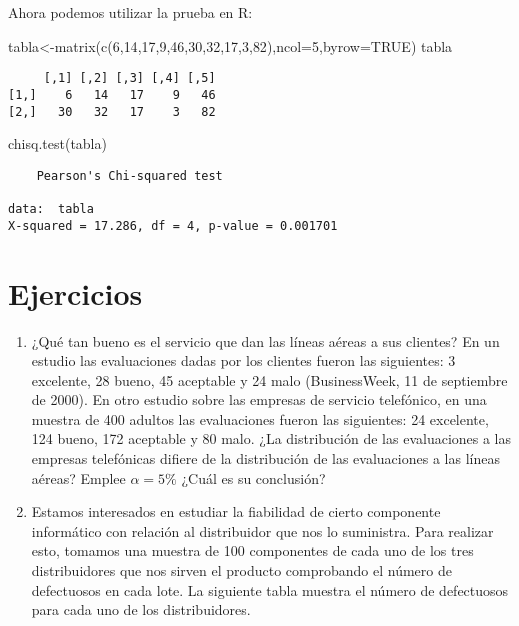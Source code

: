 \documentclass[
  a4paper,
  oneside,
  openany]{book}
\newenvironment{Shaded}{\begin{snugshade}}{\end{snugshade}}
\newcommand{\AttributeTok}[1]{\textcolor[rgb]{0.77,0.63,0.00}{#1}}
\newcommand{\ConstantTok}[1]{\textcolor[rgb]{0.00,0.00,0.00}{#1}}
\newcommand{\DecValTok}[1]{\textcolor[rgb]{0.00,0.00,0.81}{#1}}
\newcommand{\FunctionTok}[1]{\textcolor[rgb]{0.00,0.00,0.00}{#1}}
\newcommand{\NormalTok}[1]{#1}
\newcommand{\OtherTok}[1]{\textcolor[rgb]{0.56,0.35,0.01}{#1}}
\begin{document}
Ahora podemos utilizar la prueba en R:

\begin{Shaded}
\begin{Highlighting}[]
\NormalTok{tabla}\OtherTok{\textless{}{-}}\FunctionTok{matrix}\NormalTok{(}\FunctionTok{c}\NormalTok{(}\DecValTok{6}\NormalTok{,}\DecValTok{14}\NormalTok{,}\DecValTok{17}\NormalTok{,}\DecValTok{9}\NormalTok{,}\DecValTok{46}\NormalTok{,}\DecValTok{30}\NormalTok{,}\DecValTok{32}\NormalTok{,}\DecValTok{17}\NormalTok{,}\DecValTok{3}\NormalTok{,}\DecValTok{82}\NormalTok{),}\AttributeTok{ncol=}\DecValTok{5}\NormalTok{,}\AttributeTok{byrow=}\ConstantTok{TRUE}\NormalTok{)}
\NormalTok{tabla}
\end{Highlighting}
\end{Shaded}

\begin{verbatim}
     [,1] [,2] [,3] [,4] [,5]
[1,]    6   14   17    9   46
[2,]   30   32   17    3   82
\end{verbatim}

\begin{Shaded}
\begin{Highlighting}[]
\FunctionTok{chisq.test}\NormalTok{(tabla)}
\end{Highlighting}
\end{Shaded}

\begin{verbatim}
    Pearson's Chi-squared test

data:  tabla
X-squared = 17.286, df = 4, p-value = 0.001701
\end{verbatim}

\hypertarget{ejercicios-9}{%
\section{Ejercicios}\label{ejercicios-9}}

\begin{enumerate}
\def\labelenumi{\arabic{enumi}.}
\item
  ¿Qué tan bueno es el servicio que dan las líneas aéreas a sus clientes? En un estudio las evaluaciones dadas por los clientes fueron las siguientes: 3 excelente, 28 bueno, 45 aceptable y 24 malo (BusinessWeek, 11 de septiembre de 2000). En otro estudio sobre las empresas de servicio telefónico, en una muestra de 400 adultos las evaluaciones fueron las siguientes: 24 excelente, 124 bueno, 172 aceptable y 80 malo. ¿La distribución de las evaluaciones a las empresas telefónicas difiere de la distribución de las evaluaciones a las líneas aéreas? Emplee \(\alpha=5\%\) ¿Cuál es su conclusión?
\item
  Estamos interesados en estudiar la fiabilidad de cierto componente informático con relación al distribuidor que nos lo suministra. Para realizar esto, tomamos una muestra de 100 componentes de cada uno de los tres distribuidores que nos sirven el producto comprobando el número de defectuosos en cada lote. La siguiente tabla muestra el número de defectuosos para cada uno de los distribuidores.
\end{enumerate}
\end{document}

